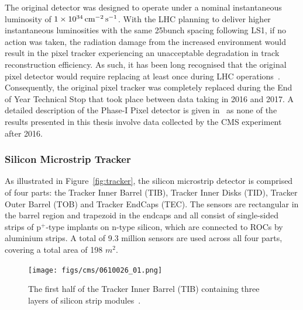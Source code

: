 The original detector was designed to operate under a nominal instantaneous luminosity of $1 \times 10^{34}\,\text{cm}^\text{$-$2}\,\text{s}^\text{$-$1}$.
With the LHC planning to deliver higher instantaneous luminosities with the same 25\ns bunch spacing following LS1, if no action was taken, the radiation damage from the increased \PU environment would result in the pixel tracker experiencing an unacceptable degradation in track reconstruction efficiency.
As such, it has been long recognised that the original pixel detector would require replacing at least once during LHC operations~\cite{CMS:1997tlf}.
Consequently, the original pixel tracker was completely replaced during the End of Year Technical Stop that took place between data taking in 2016 and 2017.
A detailed description of the Phase-I Pixel detector is given in~\cite{CMS:2012sda} as none of the results presented in this thesis involve data collected by the CMS experiment after 2016.

\subsubsection{Silicon Microstrip Tracker}
As illustrated in Figure~\ref{fig:tracker}, the silicon microstrip detector is comprised of four parts: the Tracker Inner Barrel (TIB), Tracker Inner Disks (TID), Tracker Outer Barrel (TOB) and Tracker EndCaps (TEC).
The sensors are rectangular in the barrel region and trapezoid in the endcaps and all consist of single-sided strips of p$^{+}$-type implants on n-type silicon, which are connected to ROCs by aluminium strips.
A total of 9.3 million sensors are used across all four parts, covering a total area of 198 $\unit{m}^{2}$.

\begin{figure}[htb]
\begin{center}
\vspace*{1mm}\texttt{[image: figs/cms/0610026\_01.png]}
\vspace*{1mm}\caption{The first half of the Tracker Inner Barrel (TIB) containing three layers of silicon strip modules~\cite{Maximilien:995912}.}
\label{fig:TIB}
\end{center}
\end{figure}

